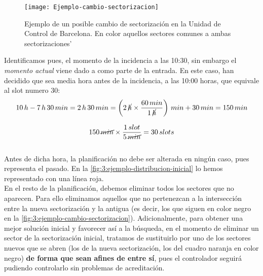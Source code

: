 \begin{figure}[htbp]
	\centering
	\texttt{[image: Ejemplo-cambio-sectorizacion]}
	\caption[Ejemplo de cambio de sectorización]{Ejemplo de un posible cambio de sectorización en la Unidad de Control 
	de Barcelona. En color aquellos sectores comunes a ambas sectorizaciones'}
	\label{fig:3:ejemplo-cambio-sectorizacion}
\end{figure}


Identificamos pues, el momento de la incidencia a las 10:30, sin embargo el \textit{momento actual} viene dado a como parte de la entrada. En este caso, han decidido que sea media hora antes de la incidencia, a las 10:00 horas, que equivale al slot numero 30:
\[ 
	10 \,h-7 \,h \,30 \,min = 2 \,h \,30 \,min = \left(2 \, \cancel{h} \times \frac{60 \,min}{1 \,\cancel{h}}\right) 
	\,min + 30\,min = 150 
	\,min 
\]

\[
	150 \,\cancel{min} \times \frac{1\,slot}{5\,\cancel{min}} = 30\,slots
\]
\\

Antes de dicha hora, la planificación no debe ser alterada en ningún caso, pues representa el pasado. En la 
\autoref{fig:3:ejemplo-distribucion-inicial} lo hemos representado con una línea roja. 
\\

En el resto de la planificación, debemos eliminar todos los sectores que no aparecen. Para ello eliminamos aquellos que no pertenezcan a la intersección entre la nueva sectorización y la antigua (es decir, los que siguen en color negro en la \autoref{fig:3:ejemplo-cambio-sectorizacion}). 
Adicionalmente, para obtener una mejor solución inicial y favorecer así a la búsqueda, en el momento de eliminar un sector de la sectorización inicial, tratamos de sustituirlo por uno de los sectores nuevos que se abren (los de la nueva sectorización, los del cuadro naranja en color negro) \textbf{de forma que sean afines de entre sí}, pues el controlador seguirá pudiendo controlarlo sin problemas de acreditación. %
\\

